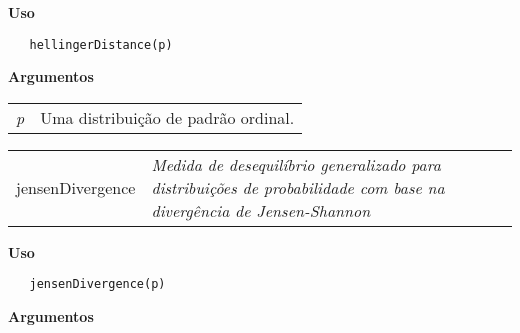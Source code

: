 \documentclass[12pt,letterpaper]{article}
\begin{document}
\vspace{-0.5cm}

\hrulefill  

\vspace{0.5cm}

\textbf{Uso}

\begin{lstlisting}
   hellingerDistance(p)
\end{lstlisting}

\vspace{0.5cm}

\textbf{Argumentos}

\begin{table}[!h]
\begin{center}
\begin{tabularx}{\textwidth}{X X}
\hspace{0.5cm} \textit{p} & Uma distribuição de padrão ordinal.\\
\end{tabularx}
\end{center}
\end{table} 


\hrulefill   

\begin{table}[!h]
\begin{center}
\begin{tabularx}{\textwidth}{ X X}
\hspace{0.5cm} jensenDivergence & \textit{Medida de desequilíbrio generalizado para distribuições de probabilidade com base na divergência de Jensen-Shannon}\\
\end{tabularx}
\end{center}
\end{table} 

\vspace{-0.5cm}

\hrulefill  

\vspace{0.5cm}

\textbf{Uso}

\begin{lstlisting}
   jensenDivergence(p)
\end{lstlisting}

\vspace{0.5cm}

\textbf{Argumentos}
\end{document}
